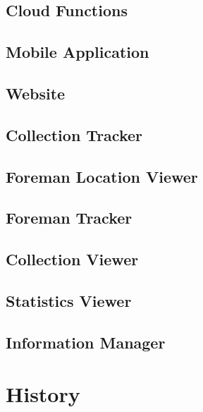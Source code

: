 \documentclass[12pt]{article}
\begin{document}
\subsection{Cloud Functions}

\subsection{Mobile Application}

\subsection{Website}

\subsection{Collection Tracker}

\subsection{Foreman Location Viewer}

\subsection{Foreman Tracker}

\subsection{Collection Viewer}

\subsection{Statistics Viewer}

\subsection{Information Manager}


\section{History}
\end{document}
